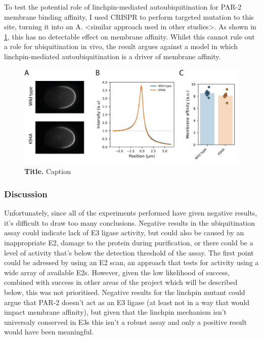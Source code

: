 \documentclass[12pt]{"article"}
\newcommand{\mycaption}[2]{\caption[#1]{\textbf{#1.} #2}}
\begin{document}
To test the potential role of linchpin-mediated autoubiquitination for PAR-2 membrane binding affinity, I used CRISPR to perform targeted mutation to this site, turning it into an A. <similar approach used in other studies>. As shown in \cref{fig:linchpin_in_vivo}, this has no detectable effect on membrane affinity. Whilst this cannot rule out a role for ubiquitination in vivo, the result argues against a model in which linchpin-mediated autoubiquitination is a driver of membrane affinity. \\


\begin{figure}[!h]
\includegraphics[scale=0.9]{linchpin_in_vivo}
\setlength{\abovecaptionskip}{20pt}
\centering
\mycaption{Title}{Caption}
\label{fig:linchpin_in_vivo}
\end{figure}

\subsubsection{Discussion}

Unfortunately, since all of the experiments performed have given negative results, it's difficult to draw too many conclusions. Negative results in the ubiquitination assay could indicate lack of E3 ligase activity, but could also be caused by an inappropriate E2, damage to the protein during purification, or there could be a level of activity that's below the detection threshold of the assay. The first point could be adressed by using an E2 scan, an approach that tests for activity using a wide array of available E2s. However, given the low likelihood of success, combined with success in other areas of the project which will be described below, this was not prioritised. Negative results for the linchpin mutant could argue that PAR-2 doesn't act as an E3 ligase (at least not in a way that would impact membrane affinity), but given that the linchpin mechanism isn't universaly conserved in E3s this isn't a robust assay and only a positive result would have been meaningful.\\
\end{document}
